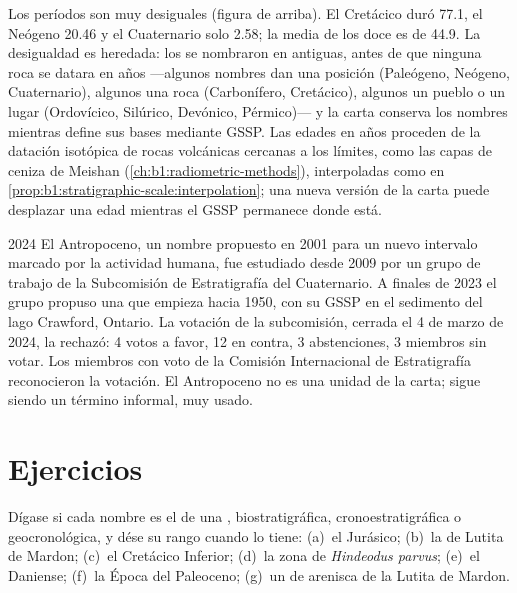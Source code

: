 Los períodos son muy desiguales (figura de arriba). El Cretácico duró \qty{77.1}{\Myr}, el Neógeno \qty{20.46}{\Myr} y el Cuaternario solo \qty{2.58}{\Myr}; la media de los doce es de \qty{44.9}{\Myr}. La desigualdad es heredada:
los  se nombraron en  antiguas, antes de que ninguna roca se datara en años ---algunos nombres dan una posición (Paleógeno, Neógeno, Cuaternario), algunos una roca (Carbonífero, Cretácico), algunos un pueblo o un lugar (Ordovícico, Silúrico, Devónico, Pérmico)---
y la carta conserva los nombres mientras define sus bases mediante GSSP. Las edades en años proceden de la datación isotópica de rocas volcánicas cercanas a los límites, como las capas de ceniza de Meishan (\cref{ch:b1:radiometric-methods}), interpoladas
como en \cref{prop:b1:stratigraphic-scale:interpolation}; una nueva versión de la carta puede desplazar una edad mientras el GSSP permanece donde está.

\begin{dated}{2024}
El Antropoceno, un nombre propuesto en 2001 para un nuevo intervalo marcado por la actividad humana, fue estudiado desde 2009 por un grupo de trabajo de la Subcomisión de Estratigrafía del Cuaternario. A finales de 2023 el grupo propuso una  que empieza hacia 1950, con su GSSP en el sedimento del lago Crawford, Ontario. La votación de la subcomisión, cerrada el 4 de marzo de 2024, la rechazó: 4 votos a favor, 12 en contra, 3 abstenciones, 3 miembros sin votar. Los miembros con voto de la Comisión Internacional de Estratigrafía reconocieron la votación. El Antropoceno no es una unidad de la carta; sigue siendo un término informal, muy usado.
\end{dated}

\section{Ejercicios}

\begin{exercise}[$\star$]\label{exo:b1:stratigraphic-scale:1}
Dígase si cada nombre es el de una , biostratigráfica, cronoestratigráfica o geocronológica, y dése su rango cuando lo tiene: (a)~el  Jurásico; (b)~la  de Lutita de Mardon; (c)~el Cretácico Inferior; (d)~la zona de \emph{Hindeodus parvus}; (e)~el  Daniense; (f)~la Época del Paleoceno; (g)~un  de arenisca de la Lutita de Mardon.
\end{exercise}

